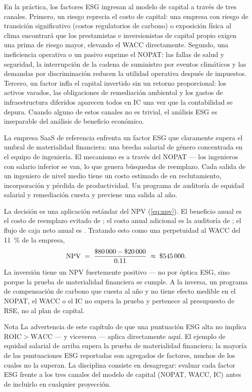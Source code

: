 En la práctica, los factores ESG ingresan al modelo de capital a través de tres canales. Primero,
un riesgo reprecia el costo de capital: una empresa con riesgo de transición significativo (costos
regulatorios de carbono) o exposición física al clima encontrará que los prestamistas e
inversionistas de capital propio exigen una prima de riesgo mayor, elevando el WACC directamente.
Segundo, una ineficiencia operativa o un pasivo suprime el NOPAT: las fallas de salud y seguridad,
la interrupción de la cadena de suministro por eventos climáticos y las demandas por
discriminación reducen la utilidad operativa después de impuestos. Tercero, un factor infla el
capital invertido sin un retorno proporcional: los activos varados, las obligaciones de
remediación ambiental y los gastos de infraestructura diferidos aparecen todos en IC una vez que
la contabilidad se depura. Cuando alguno de estos canales no es trivial, el análisis ESG es
inseparable del análisis de beneficio económico.

\begin{example}
La empresa SaaS de referencia enfrenta un factor ESG que claramente supera el umbral de
materialidad financiera: una brecha salarial de género concentrada en el equipo de ingeniería. El
mecanismo es a través del NOPAT --- los ingenieros con salario inferior se van, lo que genera
búsquedas de reemplazo. Cada salida de un ingeniero de nivel medio tiene un costo estimado de
 en reclutamiento, incorporación y pérdida de productividad. Un programa de auditoría
de equidad salarial y remediación cuesta  y previene una salida al año.

La decisión es una aplicación estándar del NPV (\cref{eq:npv}). El beneficio anual es el costo de
reemplazo evitado de ; el costo anual adicional es la auditoría de ;
el flujo de caja neto anual es . Tratando esto como una perpetuidad al WACC del
\qty{11}{\percent} de la empresa,
\[
  \mathrm{NPV} \;=\; \frac{\$\num{80000} - \$\num{20000}}{0.11} \;\approx\; \$\num{545000}.
\]
La inversión tiene un NPV fuertemente positivo --- no por óptica ESG, sino porque la prueba de
materialidad financiera se cumple. A la inversa, un programa de compensación de carbono que cuesta
 al año y no tiene efecto medible en el NOPAT, el WACC o el IC no supera la prueba
y pertenece al presupuesto de RSE, no al plan de capital.
\end{example}

\begin{admonition}{Nota}
La advertencia de este capítulo de que una puntuación ESG alta no implica
\(\mathrm{ROIC}>\mathrm{WACC}\) --- y viceversa --- aplica directamente aquí. El ejemplo de
equidad salarial de arriba supera la prueba de materialidad financiera; la mayoría de las
puntuaciones ESG reportadas son agregados de factores, muchos de los cuales no la superan. La
disciplina consiste en desagregar: evaluar cada factor ESG frente a los tres canales del modelo de
capital (NOPAT, WACC, IC) antes de incluirlo en cualquier proyección.
\end{admonition}

